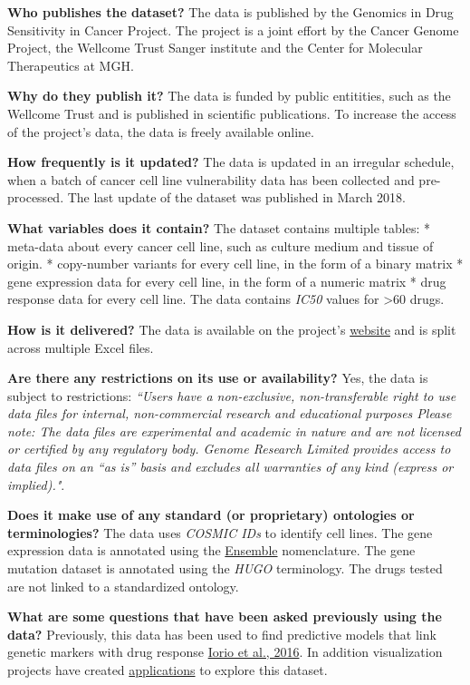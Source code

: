\documentclass[]{article}
\begin{document}
\textbf{Who publishes the dataset?} The data is published by the
Genomics in Drug Sensitivity in Cancer Project. The project is a joint
effort by the Cancer Genome Project, the Wellcome Trust Sanger institute
and the Center for Molecular Therapeutics at MGH.

\textbf{Why do they publish it?} The data is funded by public
entitities, such as the Wellcome Trust and is published in scientific
publications. To increase the access of the project's data, the data is
freely available online.

\textbf{How frequently is it updated?} The data is updated in an
irregular schedule, when a batch of cancer cell line vulnerability data
has been collected and pre-processed. The last update of the dataset was
published in March 2018.

\textbf{What variables does it contain?} The dataset contains multiple
tables: * meta-data about every cancer cell line, such as culture medium
and tissue of origin. * copy-number variants for every cell line, in the
form of a binary matrix * gene expression data for every cell line, in
the form of a numeric matrix * drug response data for every cell line.
The data contains \emph{IC50} values for \textgreater{}60 drugs.

\textbf{How is it delivered?} The data is available on the project's
\href{https://www.cancerrxgene.org/downloads}{website} and is split
across multiple Excel files.

\textbf{Are there any restrictions on its use or availability?} Yes, the
data is subject to restrictions: \emph{``Users have a non-exclusive,
non-transferable right to use data files for internal, non-commercial
research and educational purposes Please note: The data files are
experimental and academic in nature and are not licensed or certified by
any regulatory body. Genome Research Limited provides access to data
files on an ``as is'' basis and excludes all warranties of any kind
(express or implied)."}.

\textbf{Does it make use of any standard (or proprietary) ontologies or
terminologies?} The data uses \emph{COSMIC IDs} to identify cell lines.
The gene expression data is annotated using the
\href{https://useast.ensembl.org/index.html}{Ensemble} nomenclature. The
gene mutation dataset is annotated using the \emph{HUGO} terminology.
The drugs tested are not linked to a standardized ontology.

\textbf{What are some questions that have been asked previously using
the data?} Previously, this data has been used to find predictive models
that link genetic markers with drug response
\href{https://www.cell.com/fulltext/S0092-8674(16)30746-2}{Iorio et al.,
2016}. In addition visualization projects have created
\href{https://journals.plos.org/plosone/article?id=10.1371/journal.pone.0176763}{applications}
to explore this dataset.
\end{document}
